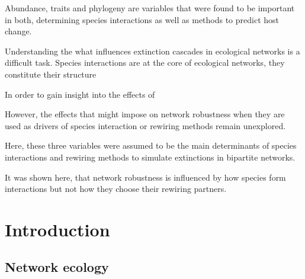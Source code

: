 \documentclass[12pt,a4paper]{article}
\begin{document}
Abundance, traits and phylogeny are variables that were found to be important in both, determining species interactions as well as methods to predict host change.

Understanding the what influences extinction cascades in ecological networks is a difficult task. Species interactions are at the core of ecological networks, they constitute their structure 

In order to gain insight into the effects of

However, the effects that  might impose on network robustness when they are used as drivers of species interaction or rewiring methods remain unexplored. 

Here, these three variables were assumed to be the main determinants of species interactions and rewiring methods to simulate extinctions in bipartite networks.

It was shown here, that network robustness is influenced by how species form interactions but not how they choose their rewiring partners. 

%
%
\section{Introduction}
\subsection{Network ecology}




%
\end{document}
